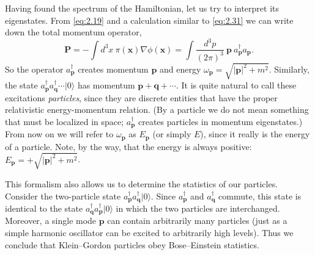Having found the spectrum of the Hamiltonian, let us try to interpret its
eigenstates.  From \eqref{eq:2.19} and a calculation similar to
\eqref{eq:2.31} we can write down the total momentum operator,
\begin{equation}
  \mathbf{P} = -\int d^3x\ \pi(\mathbf{x})\nabla\phi(\mathbf{x})
  = \int \frac{d^3p}{(2\pi)^3}\ \mathbf{p}\ a_{\mathbf{p}}^\dagger
    a_{\mathbf{p}} .
  \label{eq:2.33}
\end{equation}
So the operator $a_{\mathbf{p}}^\dagger$ creates momentum $\mathbf{p}$ and
energy $\omega_{\mathbf{p}} = \sqrt{|\mathbf{p}|^2+m^2}$.  Similarly, the
state $a_{\mathbf{p}}^\dagger a_{\mathbf{q}}^\dagger\cdots|0\rangle$ has
momentum $\mathbf{p}+\mathbf{q}+\cdots$.  It is quite natural to call
these excitations \emph{particles}, since they are discrete entities that
have the proper relativistic energy-momentum relation.  (By a particle we
do not mean something that must be localized in space;
$a_{\mathbf{p}}^\dagger$ creates particles in momentum eigenstates.)  From
now on we will refer to $\omega_{\mathbf{p}}$ as $E_{\mathbf{p}}$ (or
simply $E$), since it really is the energy of a particle.  Note, by the
way, that the energy is always positive:
$E_{\mathbf{p}} = +\sqrt{|\mathbf{p}|^2+m^2}$.

This formalism also allows us to determine the statistics of our
particles.  Consider the two-particle state
$a_{\mathbf{p}}^\dagger a_{\mathbf{q}}^\dagger|0\rangle$.  Since
$a_{\mathbf{p}}^\dagger$ and $a_{\mathbf{q}}^\dagger$ commute, this state
is identical to the state $a_{\mathbf{q}}^\dagger a_{\mathbf{p}}^\dagger
|0\rangle$ in which the two particles are interchanged.  Moreover, a
single mode $\mathbf{p}$ can contain arbitrarily many particles (just as a
simple harmonic oscillator can be excited to arbitrarily high levels).
Thus we conclude that Klein--Gordon particles obey Bose--Einstein
statistics.

